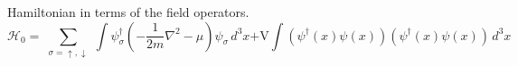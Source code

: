 \documentclass{article}
\begin{document}
Hamiltonian in terms of the field operators.
\begin{equation}
    \mathcal{H}_0=
    \sum_{\substack{
        \sigma=\uparrow,\downarrow
    }}
    \int{
        \psi^\dagger_\sigma\left(-\frac{1}{2m}\nabla^2-\mu\right)\psi_\sigma\, d^3 x
    }
    {\textrm{+V}}
    \int{
        (\psi^\dagger(x)\psi(x))(\psi^\dagger(x)\psi(x))\, d^3 x
    }
\end{equation}
\end{document}
